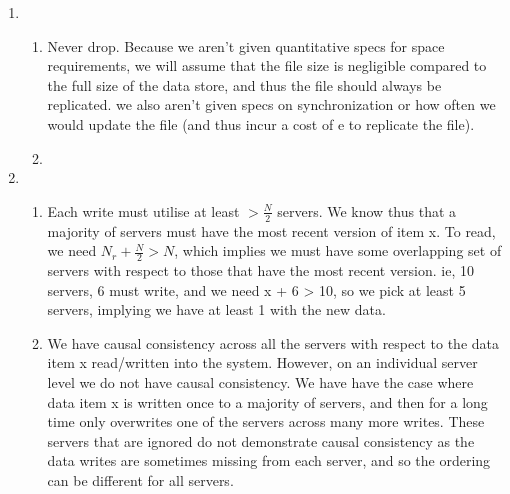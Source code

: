 \documentclass{article}
\begin{document}
\begin{enumerate}
	\item  

	\begin{enumerate}

		\item 

Never drop. Because we aren't given quantitative specs for space requirements, we will assume that the file size is negligible compared to the full size of the data store, and thus the file should always be replicated. we also aren't given specs on synchronization or how often we would update the file (and thus incur a cost of e to replicate the file).

		\item 


	\end{enumerate}

	\item  

	\begin{enumerate}

		\item 
Each write must utilise at least \( > \frac{N}{2}\) servers. We know thus that a majority of servers must have the most recent version of item x. To read, we need \( N_r + \frac{N}{2} > N \), which implies we must have some overlapping set of servers with respect to those that have the most recent version. ie, 10 servers, 6 must write, and we need x + 6 > 10, so we pick at least 5 servers, implying we have at least 1 with the new data.

		\item 
We have causal consistency across all the servers with respect to the data item x read/written into the system. However, on an individual server level we do not have causal consistency. We have have the case where data item x is written once to a majority of servers, and then for a long time only overwrites one of the servers across many more writes. These servers that are ignored do not demonstrate causal consistency as the data writes are sometimes missing from each server, and so the ordering can be different for all servers.

	\end{enumerate}

\end{enumerate}
\end{document}

